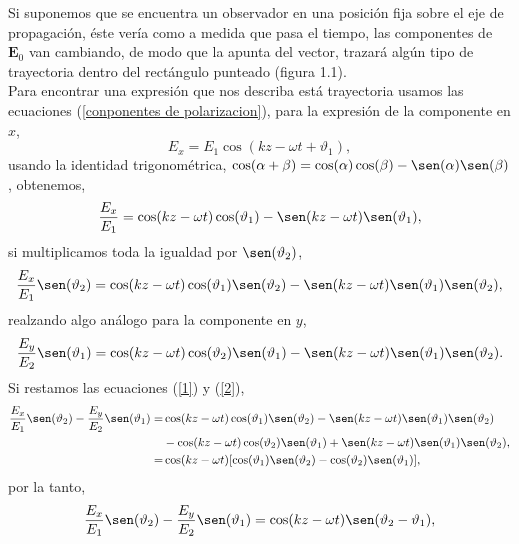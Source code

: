 \documentclass[11pt,fleqn]{book} %
\begin{document}
Si suponemos que se encuentra un observador en una posici\'on fija sobre el eje de propagaci\'on, \'este ver\'ia como a medida que pasa el
tiempo, las componentes de $\textbf{E}_0$ van cambiando, de modo que la apunta del vector, trazar\'a alg\'un tipo de trayectoria dentro del
rect\'angulo punteado (figura 1.1).\\

Para encontrar una expresi\'on que nos describa est\'a trayectoria usamos las ecuaciones (\ref{conponentes de polarizacion}), para la expresi\'on de la componente en $x$,
\begin{equation*}
E_x=E_1\cos(kz-\omega t +\vartheta_1),
\end{equation*}
usando la identidad trigonom\'etrica, $\cos(\alpha+\beta)=\cos(\alpha)\cos(\beta)-\sen(\alpha)\sen(\beta)$, obtenemos,
\begin{equation*}
\frac{E_x}{E_1}=\cos(kz-\omega t)\cos(\vartheta_1)-\sen(kz-\omega t)\sen(\vartheta_1),
\end{equation*}
si multiplicamos toda la igualdad por $\sen(\vartheta_2)$,
\begin{equation} \label{1}
\frac{E_x}{E_1}\sen(\vartheta_2)=\cos(kz-\omega t)\cos(\vartheta_1)\sen(\vartheta_2)-\sen(kz-\omega t)\sen(\vartheta_1)\sen(\vartheta_2),
\end{equation}
realzando algo an\'alogo para la componente en $y$,
\begin{equation} \label{2}
\frac{E_y}{E_2}\sen(\vartheta_1)=\cos(kz-\omega t)\cos(\vartheta_2)\sen(\vartheta_1)-\sen(kz-\omega t)\sen(\vartheta_1)\sen(\vartheta_2).
\end{equation}
Si restamos las ecuaciones (\ref{1}) y (\ref{2}),
\begin{equation*}
\begin{split}
\frac{E_x}{E_1}\sen(\vartheta_2)-\frac{E_y}{E_2}\sen(\vartheta_1)=& \cos(kz-\omega t)\cos(\vartheta_1)\sen(\vartheta_2)-\sen(kz-\omega t)\sen(\vartheta_1)\sen(\vartheta_2)\\&-\cos(kz-\omega t)\cos(\vartheta_2)\sen(\vartheta_1)+\sen(kz-\omega t)\sen(\vartheta_1)\sen(\vartheta_2),\\
=&\cos(kz-\omega t)[\cos(\vartheta_1)\sen(\vartheta_2)-\cos(\vartheta_2)\sen(\vartheta_1)],
\end{split}
\end{equation*}
por la tanto,
\begin{equation}\label{3}
\frac{E_x}{E_1}\sen(\vartheta_2)-\frac{E_y}{E_2}\sen(\vartheta_1)=\cos(kz-\omega t)\sen(\vartheta_2-\vartheta_1),
\end{equation}
\end{document}
